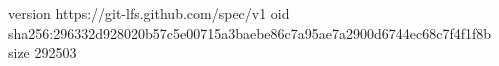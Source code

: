 version https://git-lfs.github.com/spec/v1
oid sha256:296332d928020b57c5e00715a3baebe86c7a95ae7a2900d6744ec68c7f4f1f8b
size 292503
